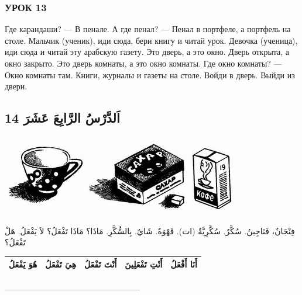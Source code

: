 \documentclass[a5paper]{article}
\begin{document}
\subsubsection{УРОК 13}
Где карандаши? — В пенале. А где пенал? — Пенал в портфеле, а портфель на столе. Мальчик (ученик), иди сюда, бери книгу и читай урок. Девочка (ученица), иди сюда и читай эту арабскую газету. Это дверь, а это окно. Дверь открыта, а окно закрыто. Это дверь комнаты, а это окно комнаты. Где окно комнаты? — Окно комнаты там. Книги, журналы и газеты на столе. Войди в дверь. Выйди из двери.

\subsection{14 اَلدَّرْسُ الرَّابِعَ عَشَرَ}
\  \includegraphics[width=1.3437in,height=1.3854in]{images/MuhammadBagauddinprettified-img026.jpg}   \includegraphics[width=1.7811in,height=1.3854in]{images/MuhammadBagauddinprettified-img027.jpg}   \includegraphics[width=0.802in,height=1.3543in]{images/MuhammadBagauddinprettified-img028.jpg} 

فِنْجَانٌ، فَنَاجِينُ. سُكَّرٌ. سُكَّرِيَّةٌ (ات). قَهْوَةٌ. شَايٌ. بِالسُّكَّرِ. مَاذَا؟ مَاذَا تَفْعَلُ؟ لاَ يَفْعَلُ. هَلْ تَفْعَلُ؟

\begin{flushleft}
\tablefirsthead{}
\tablehead{}
\tabletail{}
\tablelasttail{}
\begin{supertabular}{|m{1.1712599in}|m{1.2962599in}|m{1.2962599in}|m{1.4212599in}|m{1.0670599in}|}
\hline
هُوَ يَفْعَلُ &
هِيَ تَفْعَلُ &
أَنْتَ تَفْعَلُ &
أَنْتِ تَفْعَلِينَ &
أَنَا أَفْعَلُ\\\hline
\end{supertabular}
\end{flushleft}
\_\_\_\_\_\_\_\_\_\_\_\_\_\_\_\_\_\_\_\_\_\_
\end{document}
